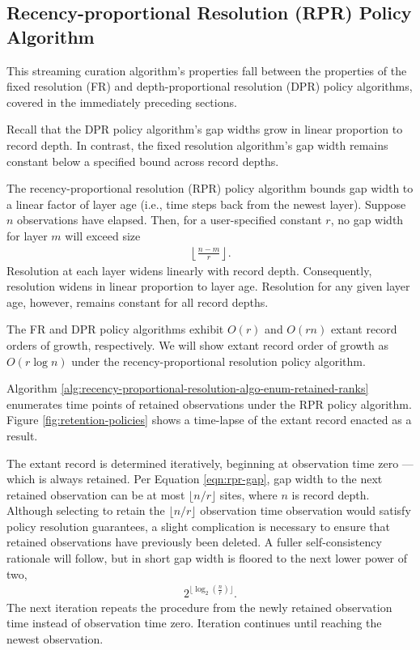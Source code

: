 \subsection{Recency-proportional Resolution (RPR) Policy Algorithm}
\label{sec:recency-proportional-resolution-algo}

This streaming curation algorithm's properties fall between the properties of the fixed resolution (FR) and depth-proportional resolution (DPR) policy algorithms, covered in the immediately preceding sections.

Recall that the DPR policy algorithm's gap widths grow in linear proportion to record depth.
In contrast, the fixed resolution algorithm's gap width remains constant below a specified bound across record depths.

The recency-proportional resolution (RPR) policy algorithm bounds gap width to a linear factor of layer age (i.e., time steps back from the newest layer).
Suppose $n$ observations have elapsed.
Then, for a user-specified constant $r$, no gap width for layer $m$ will exceed size
\begin{align}
  \left\lfloor \frac{n - m}{r} \right\rfloor.
  \label{eqn:rpr-gap}
\end{align}
Resolution at each layer widens linearly with record depth.
Consequently, resolution widens in linear proportion to layer age.
Resolution for any given layer age, however, remains constant for all record depths.

The FR and DPR policy algorithms exhibit $O(r)$ and $O(rn)$ extant record orders of growth, respectively.
We will show extant record order of growth as $O(r\log{n})$ under the recency-proportional resolution policy algorithm.

Algorithm \ref{alg:recency-proportional-resolution-algo-enum-retained-ranks} enumerates time points of retained observations under the RPR policy algorithm.
Figure \ref{fig:retention-policies} shows a time-lapse of the extant record enacted as a result. %

The extant record is determined iteratively, beginning at observation time zero --- which is always retained.
Per Equation \ref{eqn:rpr-gap}, gap width to the next retained observation can be at most $\lfloor n/r \rfloor$ sites, where $n$ is record depth.
Although selecting to retain the $\lfloor n/r \rfloor$ observation time observation would satisfy policy resolution guarantees, a slight complication is necessary to ensure that retained observations have previously been deleted.
A fuller self-consistency rationale will follow, but in short gap width is floored to the next lower power of two,
\begin{align*}
  2^{\lfloor \log_{2}\left(\frac{n}{r}\right) \rfloor}.
\end{align*}
The next iteration repeats the procedure from the newly retained observation time instead of observation time zero.
Iteration continues until reaching the newest observation.


